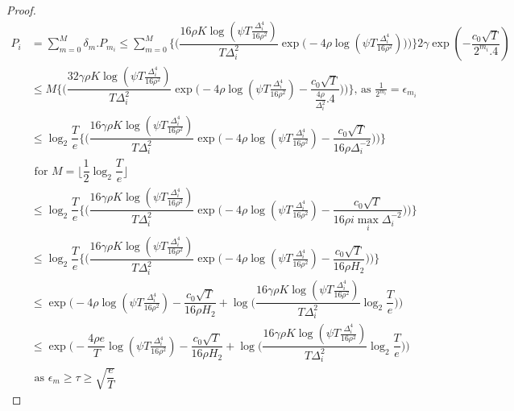 \begin{proof}
\begin{align*}
P_{i} &= \sum_{m=0}^{M} \delta_{m}.P_{m_{i}} \leq \sum_{m=0}^{M} \bigg\lbrace \bigg(\dfrac{16\rho K\log (\psi T \frac{\Delta_{i}^{4}}{16\rho^{2}})}{T\Delta_{i}^{2}}\exp\big(-4\rho\log (\psi T\frac{\Delta_{i}^{4}}{16\rho^{2}})\big)\bigg) \bigg\rbrace2\gamma \exp(-\dfrac{c_{0}\sqrt{T}}{2^{m_{i}}.4})\\
& \leq M \bigg\lbrace \bigg(\dfrac{32\gamma\rho K\log (\psi T \frac{\Delta_{i}^{4}}{16\rho^{2}})}{T\Delta_{i}^{2}}\exp\big(-4\rho\log (\psi T\frac{\Delta_{i}^{4}}{16\rho^{2}})-\dfrac{c_{0}\sqrt{T}}{\frac{4\rho}{\Delta_{i}^{2}}.4}\big)\bigg) \bigg\rbrace \text{, as $\frac{1}{2^{m_{i}}}=\epsilon_{m_{i}}$}\\
& \leq \log_{2}\dfrac{T}{e}\bigg\lbrace \bigg(\dfrac{16\gamma\rho K\log (\psi T \frac{\Delta_{i}^{4}}{16\rho^{2}})}{T\Delta_{i}^{2}}\exp\big(-4\rho\log (\psi T\frac{\Delta_{i}^{4}}{16\rho^{2}})-\dfrac{c_{0}\sqrt{T}}{16\rho\Delta_{i}^{-2}}\big)\bigg) \bigg\rbrace\\
&\text{ for $M=\big \lfloor \dfrac{1}{2}\log_{2} \dfrac{T}{e}\big\rfloor$}\\
& \leq \log_{2}\dfrac{T}{e}\bigg\lbrace \bigg(\dfrac{16\gamma\rho K\log (\psi T \frac{\Delta_{i}^{4}}{16\rho^{2}})}{T\Delta_{i}^{2}}\exp\big(-4\rho\log (\psi T\frac{\Delta_{i}^{4}}{16\rho^{2}})-\dfrac{c_{0}\sqrt{T}}{16\rho i\max_{i}\Delta_{i}^{-2}}\big)\bigg) \bigg\rbrace\\
& \leq \log_{2}\dfrac{T}{e}\bigg\lbrace \bigg(\dfrac{16\gamma\rho K\log (\psi T \frac{\Delta_{i}^{4}}{16\rho^{2}})}{T\Delta_{i}^{2}}\exp\big(-4\rho\log (\psi T\frac{\Delta_{i}^{4}}{16\rho^{2}})-\dfrac{c_{0}\sqrt{T}}{16\rho H_{2}}\big)\bigg) \bigg\rbrace\\
& \leq \exp\bigg(-4\rho\log (\psi T\frac{\Delta_{i}^{4}}{16\rho^{2}})-\dfrac{c_{0}\sqrt{T}}{16\rho H_{2}} + \log \big( \dfrac{16\gamma\rho K\log (\psi T \frac{\Delta_{i}^{4}}{16\rho^{2}})}{T\Delta_{i}^{2}}\log_{2}\dfrac{T}{e} \big) \bigg)\\
&  \leq \exp\bigg(-\dfrac{4\rho e}{T}\log (\psi T\frac{\Delta_{i}^{4}}{16\rho^{2}})-\dfrac{c_{0}\sqrt{T}}{16\rho H_{2}} + \log \big( \dfrac{16\gamma\rho K\log (\psi T \frac{\Delta_{i}^{4}}{16\rho^{2}})}{T\Delta_{i}^{2}}\log_{2}\dfrac{T}{e} \big) \bigg)\\
& \text{ as $\epsilon_{m}\geq\tau\geq\sqrt{\dfrac{e}{T}}$}
\end{align*}




\end{proof}
